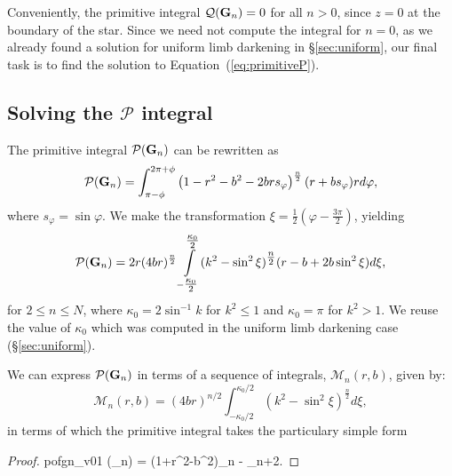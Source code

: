 \documentclass[modern,trackchanges]{aastex63}
\begin{document}
Conveniently, the primitive integral $\mathcal{Q}({\mathbf{G}}_n) = 0$ for
all $n > 0$, since $z=0$ at the boundary of the star.
Since we need not compute the integral for $n=0$, as we already
found a solution for uniform limb darkening in \S\ref{sec:uniform},
our final task is to find the solution to Equation~(\ref{eq:primitiveP}).

\pagebreak %

\subsection{Solving the $\mathcal{P}$ integral}
\label{sec:Pintegral}

The primitive integral
$\mathcal{P}({\mathbf{G}}_n)$ can be rewritten as
\begin{equation}
\mathcal{P}({\mathbf{G}}_n) =
\int_{\pi-\phi}^{2\pi + \phi} \left(1-r^2-b^2-2br s_\varphi\right)^{\frac{n}{2}} (r+b s_\varphi) r d\varphi,
\end{equation}
where $s_\varphi = \sin{\varphi}$.
We make the transformation $\xi = \tfrac{1}{2} \left(\varphi - \tfrac{3\pi}{2}\right)$, yielding
\begin{equation}\label{eq:greens_transformed}
\mathcal{P}({\mathbf{G}}_n) =
2r (4br)^{\frac{n}{2}}\int\displaylimits_{-\tfrac{\kappa_0}{2}}^{\tfrac{\kappa_0}{2}}
(k^2-\sin^2\xi)^{\tfrac{n}{2}} (r-b + 2b \sin^2 \xi) d\xi,
\end{equation}
for $2 \le n \le N$, where $\kappa_0 = 2 \sin^{-1}k$ for $k^2 \le 1$ and
$\kappa_0 = \pi$ for $k^2 > 1$.  We
reuse the value of $\kappa_0$ which was computed in the uniform limb darkening
case (\S \ref{sec:uniform}).


We can express $\mathcal{P}({\mathbf{G}}_n)$ in terms of a sequence of integrals,
$\mathcal{M}_n(r,b)$, given by:
\begin{equation}\label{eq:M_of_n}
\mathcal{M}_n(r,b) = (4br)^{n/2} \int_{-\kappa_0/2}^{\kappa_0/2} (k^2-\sin^2\xi)^{\tfrac{n}{2}} d\xi,
\end{equation}
in terms of which the primitive integral takes the particulary simple form
\begin{proof}{pofgn_v01}\label{eq:primitive}
(_n) = (1+r^2-b^2)_n - _{n+2}.
\end{proof}
\end{document}
